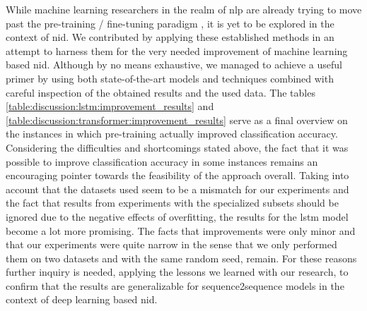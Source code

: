 While machine learning researchers in the realm of \gls{nlp} are already trying to move past the pre-training / fine-tuning paradigm \cite{gpt3}, it is yet to be explored in the context of \gls{nid}. We contributed by applying these established methods in an attempt to harness them for the very needed improvement of
machine learning based \gls{nid}. Although by no means exhaustive, we managed to achieve a useful primer by using both state-of-the-art models and techniques combined with careful inspection of the obtained results and the used data. The tables \ref{table:discussion:lstm:improvement_results} and \ref{table:discussion:transformer:improvement_results} serve as a final overview on the instances in which pre-training actually improved classification accuracy. Considering the difficulties and shortcomings stated above, the fact that it was possible to improve classification accuracy in some instances remains an encouraging pointer towards the feasibility of the approach overall. Taking into account that the datasets used seem to be a mismatch for our experiments and the fact that results from experiments with the specialized subsets should be ignored due to the negative effects of overfitting, the results for the \gls{lstm} model become a lot more promising. 
The facts that improvements were only minor and that our experiments were quite narrow in the sense that we only performed them on two datasets and with the same random seed, remain. For these reasons further inquiry is needed, applying the lessons we learned with our research, to confirm that the results are generalizable for sequence2sequence models in the context of deep learning based \gls{nid}. \par

\newpage